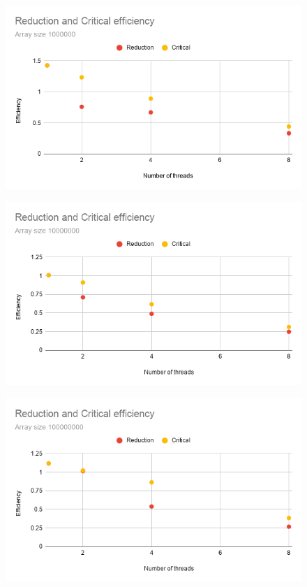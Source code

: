 \documentclass[unicode,11pt,a4paper,oneside,numbers=endperiod,openany]{scrartcl}
\begin{document}
\begin{enumerate}
        \begin{figure}[H]
            \centering
            \includegraphics[width=0.9\linewidth]{"Reduction and Critical efficiency-2"}
        \end{figure}

        \begin{figure}[H]
            \centering
            \includegraphics[width=0.9\linewidth]{"Reduction and Critical efficiency-3"}
        \end{figure}

        \begin{figure}[H]
            \centering
            \includegraphics[width=0.9\linewidth]{"Reduction and Critical efficiency-4"}
        \end{figure}


\end{enumerate}
\end{document}
